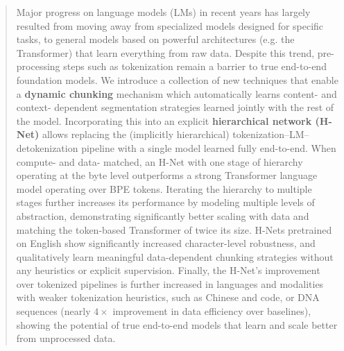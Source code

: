 \begin{abstract}
\noindent
Major progress on language models (LMs) in recent years has largely resulted from moving away from specialized models designed for specific tasks,
to general models based on powerful architectures (e.g. the Transformer) that learn everything from raw data.
Despite this trend, pre-processing steps such as tokenization remain a barrier to true end-to-end foundation models.
We introduce a collection of new techniques that enable a \textbf{dynamic chunking} mechanism which automatically learns content- and context- dependent segmentation strategies learned jointly with the rest of the model.
Incorporating this into an explicit \textbf{hierarchical network (H-Net)} allows replacing the (implicitly hierarchical) tokenization--LM--detokenization pipeline with a single model learned fully end-to-end.
When compute- and data- matched, an H-Net with one stage of hierarchy operating at the byte level outperforms a strong Transformer language model operating over BPE tokens.
Iterating the hierarchy to multiple stages further increases its performance by modeling multiple levels of abstraction, demonstrating significantly better scaling with data and matching the token-based Transformer of twice its size.
H-Nets pretrained on English show significantly increased character-level robustness, and qualitatively learn meaningful data-dependent chunking strategies without any heuristics or explicit supervision.
Finally, the H-Net's improvement over tokenized pipelines is further increased in languages and modalities with weaker tokenization heuristics, such as Chinese and code, or DNA sequences (nearly $4\times$ improvement in data efficiency over baselines),
showing the potential of true end-to-end models that learn and scale better from unprocessed data.
\end{abstract}

